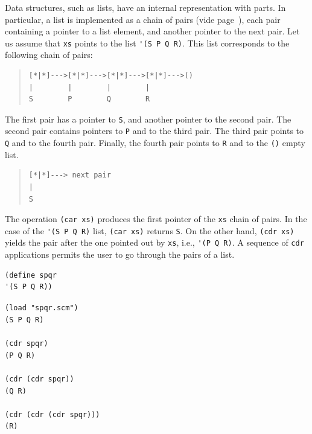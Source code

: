 \documentclass[a4paper,12pt]{book}
\newenvironment{fmpage}[1]
           {\begin{lrbox}{\fmbox}\begin{minipage}{#1}}
           {\end{minipage}\end{lrbox}\fbox{\usebox{\fmbox}}}
\begin{document}
Data structures, such as lists, have
an internal representation with parts. 
In particular, a list is implemented
as a chain of pairs 
(vide page~\pageref{page:cartesian-pair}),
each pair containing
a pointer to a list element,
and another pointer to the next pair. 
Let us assume that
\verb|xs| points to the list
\verb|'(S P Q R)|.
This list corresponds to the following
chain of pairs:
\begin{quote}
\begin{verbatim}
[*|*]--->[*|*]--->[*|*]--->[*|*]--->()
|        |        |        |        
S        P        Q        R       
\end{verbatim}
\end{quote}
The first pair has a pointer to \verb|S|,
and another pointer to the second pair.
The second pair contains pointers to 
\verb|P| and to the third pair. 
The third pair points to \verb|Q| and
to the fourth pair. Finally, the fourth
pair points to \verb|R| and to 
the \verb|()| empty list.

\begin{quote}
\begin{verbatim}
[*|*]---> next pair
|        
S      
\end{verbatim}
\end{quote}
The operation \verb|(car xs)| produces
the first pointer of the \verb|xs| 
chain of pairs. In the case of
the \verb|'(S P Q R)| list, \verb|(car xs)|
returns \verb|S|. On the other hand,
\verb|(cdr xs)| yields the pair
after the one pointed out by \verb|xs|,
i.e., \verb|'(P Q R)|. A sequence
of \verb|cdr| applications permits the user to
go through the pairs of a list. \\

\begin{fmpage}{0.8\linewidth}
\begin{verbatim}
(define spqr
'(S P Q R))
\end{verbatim}
\end{fmpage}

\begin{fmpage}{0.8\linewidth}
\verb|(load "spqr.scm")|\keys{~]~}\\
\verb|(S P Q R)|\\
\verb||\\
\verb|(cdr spqr)|\\
\verb|(P Q R)|\\
\verb||\\
\verb|(cdr (cdr spqr))|\\
\verb|(Q R)|\\
\verb||\\
\verb|(cdr (cdr (cdr spqr)))|\\
\verb|(R)|
\end{fmpage}
\end{document}
